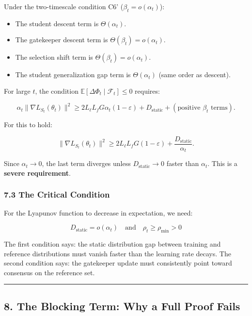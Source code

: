 \documentclass[
  12pt,
]{article}
\providecommand{\tightlist}{%
  \setlength{\itemsep}{0pt}\setlength{\parskip}{0pt}}
\begin{document}
Under the two-timescale condition C6' (\(\beta_t = o(\alpha_t)\)):

\begin{itemize}
\tightlist
\item
  The student descent term is \(\Theta(\alpha_t)\).
\item
  The gatekeeper descent term is \(\Theta(\beta_t) = o(\alpha_t)\).
\item
  The selection shift term is \(\Theta(\beta_t) = o(\alpha_t)\).
\item
  The student generalization gap term is \(\Theta(\alpha_t)\) (same
  order as descent).
\end{itemize}

For large \(t\), the condition
\(\mathbb{E}[\Delta\Phi_t \mid \mathcal{F}_t] \leq 0\) requires:

\[\alpha_t \|\nabla L_{S_t}(\theta_t)\|^2 \geq 2 L_\ell L_f G \alpha_t (1-\varepsilon) + D_{\text{static}} + (\text{positive } \beta_t \text{ terms}).\]

For this to hold:

\[\|\nabla L_{S_t}(\theta_t)\|^2 \geq 2 L_\ell L_f G (1-\varepsilon) + \frac{D_{\text{static}}}{\alpha_t}.\]

Since \(\alpha_t \to 0\), the last term diverges unless
\(D_{\text{static}} \to 0\) faster than \(\alpha_t\). This is a
\textbf{severe requirement}.

\subsubsection{7.3 The Critical Condition}\label{the-critical-condition}

For the Lyapunov function to decrease in expectation, we need:

\[\boxed{\;D_{\text{static}} = o(\alpha_t) \quad \text{and} \quad \rho_t \geq \rho_{\min} > 0\;}\]

The first condition says: the static distribution gap between training
and reference distributions must vanish faster than the learning rate
decays. The second condition says: the gatekeeper update must
consistently point toward consensus on the reference set.

\begin{center}\rule{0.5\linewidth}{0.5pt}\end{center}

\subsection{8. The Blocking Term: Why a Full Proof
Fails}\label{the-blocking-term-why-a-full-proof-fails}
\end{document}
